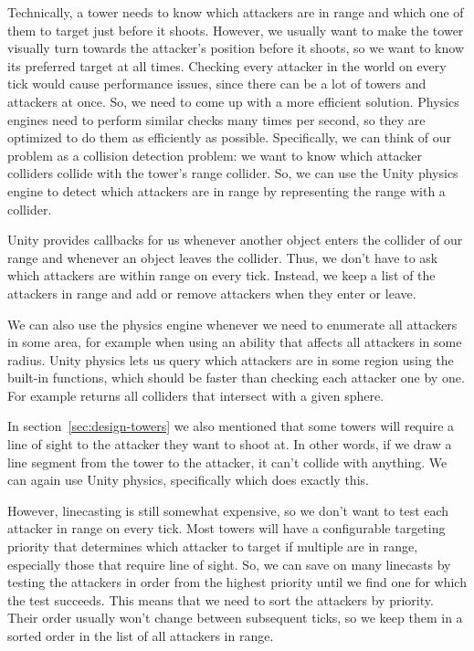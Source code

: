 Technically, a tower needs to know which attackers are in range and which one of them to target just before it shoots.
However, we usually want to make the tower visually turn towards the attacker's position before it shoots, so we want to know its preferred target at all times.
Checking every attacker in the world on every tick would cause performance issues, since there can be a lot of towers and attackers at once.
So, we need to come up with a more efficient solution.
Physics engines need to perform similar checks many times per second, so they are optimized to do them as efficiently as possible.
Specifically, we can think of our problem as a collision detection problem: we want to know which attacker colliders collide with the tower's range collider.
So, we can use the Unity physics engine to detect which attackers are in range by representing the range with a collider.

Unity provides callbacks for us whenever another object enters the collider of our range and whenever an object leaves the collider.
Thus, we don't have to ask which attackers are within range on every tick.
Instead, we keep a list of the attackers in range and add or remove attackers when they enter or leave.

We can also use the physics engine whenever we need to enumerate all attackers in some area, for example when using an ability that affects all attackers in some radius.
Unity physics lets us query which attackers are in some region using the built-in functions, which should be faster than checking each attacker one by one.
For example  returns all colliders that intersect with a given sphere.

In section~\ref{sec:design-towers} we also mentioned that some towers will require a line of sight to the attacker they want to shoot at.
In other words, if we draw a line segment from the tower to the attacker, it can't collide with anything.
We can again use Unity physics, specifically  which does exactly this.

However, linecasting is still somewhat expensive, so we don't want to test each attacker in range on every tick.
Most towers will have a configurable targeting priority that determines which attacker to target if multiple are in range, especially those that require line of sight.
So, we can save on many linecasts by testing the attackers in order from the highest priority until we find one for which the test succeeds.
This means that we need to sort the attackers by priority.
Their order usually won't change between subsequent ticks, so we keep them in a sorted order in the list of all attackers in range.

